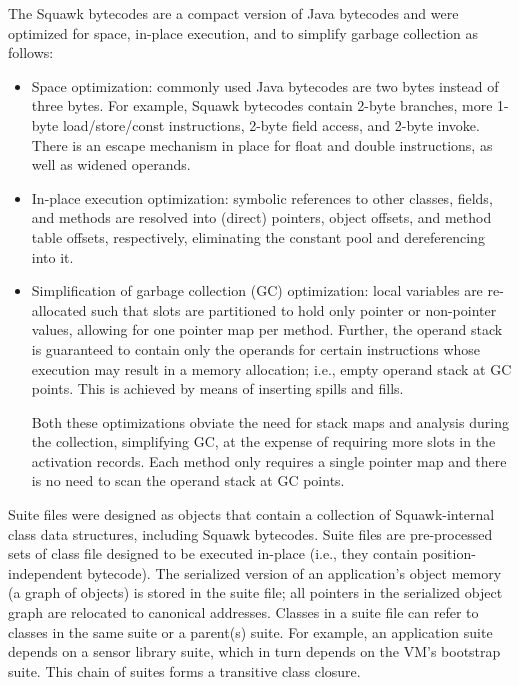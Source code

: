 \documentclass{sigplanconf}
\begin{document}
The Squawk bytecodes are a compact version of Java bytecodes and 
were optimized for space, in-place execution, and to simplify garbage 
collection as follows: 

\begin{itemize}
\item Space optimization: commonly used Java bytecodes are two bytes instead 
	of three bytes.  For example, Squawk bytecodes contain 2-byte branches,
	more 1-byte load/store/const instructions, 2-byte field access, 
	and 2-byte invoke.  There is an escape mechanism in place for float 
	and double instructions, as well as widened operands.  

\item In-place execution optimization: symbolic references to other classes,
	fields, and methods are resolved into (direct) pointers, object 
	offsets, and method table offsets, respectively, eliminating the 
	constant pool and dereferencing into it. 

\item Simplification of garbage collection (GC) optimization: local variables are 
	re-allocated such that slots are partitioned to hold only pointer or 
	non-pointer values, allowing for one pointer map per method.  
	Further, the operand stack is guaranteed to contain only the operands for certain 
	instructions whose execution may result in a memory allocation; i.e.,
	empty operand stack at GC points.  This is achieved by means of 
	inserting spills and fills. 

	Both these optimizations obviate the need for stack maps and analysis during
	the collection, simplifying GC, at the expense of requiring more slots 
	in the activation records. 
	Each method only requires a single pointer map and there is no need to 
	scan the operand stack at GC points.
\end{itemize}

Suite files were designed as objects that contain a collection of 
Squawk-internal class data structures, including Squawk bytecodes.
Suite files are pre-processed sets of class file designed to be  
executed in-place (i.e., they contain position-independent bytecode). 
The serialized version of an application's object memory (a graph
of objects) is stored in the suite file; all pointers in the
serialized object graph are relocated to canonical addresses. 
Classes in a suite file can refer to classes in the same suite 
or a parent(s) suite.
For example, an application suite depends on a sensor library 
suite, which in turn depends on the VM's bootstrap suite.
This chain of suites forms a transitive class closure.  
\end{document}
